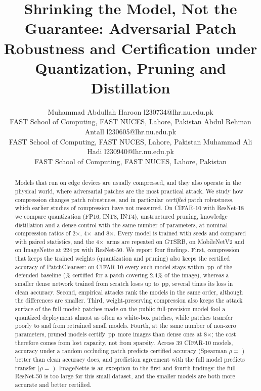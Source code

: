 \documentclass[10pt]{article}
\title{Shrinking the Model, Not the Guarantee: Adversarial Patch Robustness and Certification under Quantization, Pruning and Distillation}
\author{\name Muhammad Abdullah Haroon \email l230734@lhr.nu.edu.pk \\
       \addr FAST School of Computing, FAST NUCES, Lahore, Pakistan
       \AND
       \name Abdul Rehman Antall \email l230605@lhr.nu.edu.pk \\
       \addr FAST School of Computing, FAST NUCES, Lahore, Pakistan
       \AND
       \name Muhammad Ali Hadi \email l230940@lhr.nu.edu.pk \\
       \addr FAST School of Computing, FAST NUCES, Lahore, Pakistan}
\newcommand{\pp}{\,pp}
\newcommand{\x}{$\times$}
\begin{document}
\maketitle

\begin{abstract}
Models that run on edge devices are usually compressed, and they also operate in the physical world, where adversarial
patches are the most practical attack. We study how compression changes patch robustness, and in particular
\emph{certified} patch robustness, which earlier studies of compression have not measured. On CIFAR-10 with ResNet-18 we
compare quantization (FP16, INT8, INT4), unstructured pruning, knowledge distillation and a dense control with the same
number of parameters, at nominal compression ratios of 2\x, 4\x\ and 8\x. Every model is trained with  seeds and
compared with paired statistics, and the 4\x\ arms are repeated on GTSRB, on MobileNetV2 and on ImageNette at 224\,px with
ResNet-50. We report four findings. First, compression that keeps the trained weights (quantization and pruning) also keeps
the certified accuracy of PatchCleanser: on CIFAR-10 every such model stays within \pp\ of the defended
baseline (\% certified for a patch covering 2.4\% of the image), whereas a smaller dense
network trained from scratch loses up to \pp, several times its loss in
clean accuracy. Second, empirical attacks rank the models in the same order, although the differences are smaller. Third,
weight-preserving compression also keeps the attack surface of the full model: patches made on the public full-precision
model fool a quantized deployment almost as often as white-box patches, while patches transfer poorly to and from
retrained small models. Fourth, at the same number of non-zero parameters, pruned models certify
\pp\ more images than dense ones at 8\x; the cost therefore comes from lost capacity,
not from sparsity. Across 39 CIFAR-10 models, accuracy under a random occluding patch predicts certified accuracy
(Spearman $\rho=$ ) better than clean accuracy does, and prediction agreement with the
full model predicts transfer ($\rho=$ ). ImageNette is an exception to the
first and fourth findings: the full ResNet-50 is too large for this small dataset, and the smaller models are both more
accurate and better certified.
\end{abstract}
\end{document}
